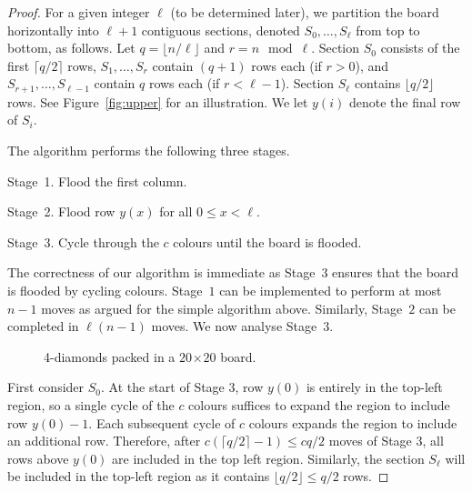\documentclass[a4paper,11pt]{llncs}
\newcommand{\pgfgraphic}[1]{}
\newcounter{l}
\renewcommand{\leq}{\leqslant}
\newcommand{\recdim}[2]{$#1$$\mspace{1mu}$$\times$$\mspace{1mu}$$#2$}
\begin{document}
\begin{proof}

For a given integer $\ell$ (to be determined later), we partition the board horizontally into $\ell+1$ contiguous sections, denoted $S_0,\dots,S_\ell$ from top to bottom, as follows. Let $q=\lfloor n/\ell \rfloor$ and $r=n \mod \ell$. Section $S_0$ consists of the first $\lceil q/2 \rceil$ rows, $S_1,\dots,S_r$ contain $(q+1)$ rows each (if $r>0$), and $S_{r+1},\dots,S_{\ell-1}$ contain $q$ rows each (if $r<\ell-1$). Section $S_\ell$ contains $\lfloor q/2 \rfloor$ rows. See Figure~\ref{fig:upper} for an illustration. We let $y(i)$ denote the final row of $S_i$.

The algorithm performs the following three stages.
\begin{description}
    \item{Stage~1.} Flood the first column.
    \item{Stage~2.} Flood row $y(x)$ for all $0\leq x < \ell$.
    \item{Stage~3.} Cycle through the $c$ colours until the board is flooded.
\end{description}


The correctness of our algorithm is immediate as Stage~$3$ ensures that the board is flooded by cycling colours. Stage~$1$ can be implemented to perform at most $n-1$ moves as argued for the simple algorithm above. Similarly, Stage~$2$ can be completed in $\ell (n-1)$ moves. We now analyse Stage~$3$.
\begin{figure}[t]
    \begin{minipage}[b]{0.50\linewidth}
        \centering
        \pgfgraphic{graphic-upper}
        \caption{The board decomposition used in the proof of Theorem~\ref{thm:good}.\label{fig:upper}}
    \end{minipage}\hspace{0.06\linewidth}\begin{minipage}[b]{0.44\linewidth}
        \centering
        \pgfgraphic{graphic-packed}
        \caption{4-diamonds packed in a \recdim{20}{20} board.\label{fig:packed}}
    \end{minipage}
\end{figure}

First consider $S_0$. At the start of Stage $3$, row $y(0)$ is entirely in the top-left region, so a single cycle of the $c$ colours suffices to expand the region to include row $y(0)-1$. Each subsequent cycle of $c$ colours expands the region to include an additional row. Therefore, after $c(\lceil q/2 \rceil -1)\leq cq/2$ moves of Stage $3$, all rows above $y(0)$ are included in the top left region. Similarly, the section $S_\ell$ will be included in the top-left region as it contains $\lfloor q/2 \rfloor \leq q/2$ rows.


\end{proof}
\end{document}
